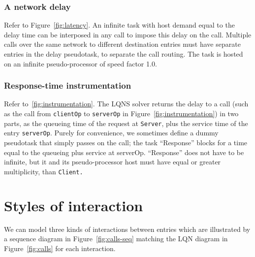 \documentclass[11pt]{article}
\begin{document}
\subsubsection{A network delay}
Refer to Figure~\ref{fig:latency}. An infinite task with host demand equal to the delay
time can be interposed in any call to impose this delay on the call. Multiple calls over the same
network to different destination entries must have separate entries in the delay pseudotask, to
separate the call routing. The task is hosted on an infinite pseudo-processor of speed factor 1.0.

\subsubsection{Response-time instrumentation} 
Refer to~\ref{fig:instrumentation}. The LQNS solver returns the delay to a
call (such as the call from \texttt{clientOp} to \texttt{serverOp} in Figure~\ref{fig:instrumentation}) in two parts, as the queueing time of
the request at \texttt{Server}, plus the service time of the entry \texttt{serverOp}. Purely for convenience, we
sometimes define a dummy pseudotask that simply passes on the call; the task ``Response'' blocks
for a time equal to the queueing plus service at serverOp. ``Response'' does not have to be infinite,
but it and its pseudo-processor host must have equal or greater multiplicity, than \texttt{Client.}

\section{Styles of interaction}
\label{sec:calls}

We can model three kinds of interactions between entries which are
illustrated by a sequence diagram in Figure~\ref{fig:calls-seq}
matching the LQN diagram in Figure~\ref{fig:calls} for each interaction.
\end{document}

